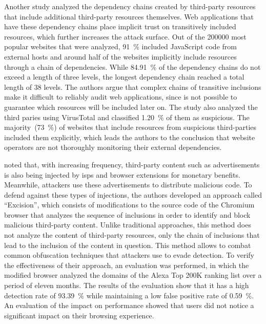 Another study \cite{ThirdPartyResources} analyzed the dependency chains created by third-party resources that include additional third-party resources themselves. Web applications that have these dependency chains place implicit trust on transitively included resources, which further increases the attack surface. Out of the \num[round-precision=0]{200000} most popular websites that were analyzed, \SI[round-precision=0]{91}{\percent} included JavaScript code from external hosts and around half of the websites implicitly include resources through a chain of dependencies. While \SI[round-precision=2]{84.91}{\percent} of the dependency chains do not exceed a length of three levels, the longest dependency chain reached a total length of \num[round-precision=0]{38} levels. The authors argue that complex chains of transitive inclusions make it difficult to reliably audit web applications, since is not possible to guarantee which resources will be included later on. The study also analyzed the third paries using VirusTotal and classified \SI[round-precision=2]{1.20}{\percent} of them as suspicious. The majority~(\SI[round-precision=0]{73}{\percent}) of websites that include resources from suspicious third-parties included them explicitly, which leads the authors to the conclusion that website operators are not thoroughly monitoring their external dependencies.

\citeauthor*{InBrowserDetection} \cite{InBrowserDetection} noted that, with increasing frequency, third-party content such as advertisements is also being injected by \acp{isp} and browser extensions for monetary benefits. Meanwhile, attackers use these advertisements to distribute malicious code. To defend against these types of injections, the authors developed an approach called “Excision”, which consists of modifications to the source code of the Chromium browser that analyzes the sequence of inclusions in order to identify and block malicious third-party content. Unlike traditional approaches, this method does not analyze the content of third-party resources, only the chain of inclusions that lead to the inclusion of the content in question. This method allows to combat common obfuscation techniques that attackers use to evade detection. To verify the effectiveness of their approach, an evaluation was performed, in which the modified browser analyzed the domains of the Alexa Top 200K ranking list over a period of eleven months. The results of the evaluation show that it has a high detection rate of \SI[round-precision=2]{93.39}{\percent} while maintaining a low false positive rate of \SI[round-precision=2]{0.59}{\percent}. An evaluation of the impact on performance showed that users did not notice a significant impact on their browsing experience.

